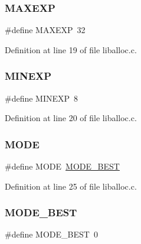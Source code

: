 \subsubsection{\texorpdfstring{M\+A\+X\+E\+XP}{MAXEXP}}
{\footnotesize\ttfamily \#define M\+A\+X\+E\+XP~32}



Definition at line 19 of file liballoc.\+c.

\mbox{\label{a00035_ae7249b0af4d1bfe02a4c7bdbf810bd8c_ae7249b0af4d1bfe02a4c7bdbf810bd8c}} 
\subsubsection{\texorpdfstring{M\+I\+N\+E\+XP}{MINEXP}}
{\footnotesize\ttfamily \#define M\+I\+N\+E\+XP~8}



Definition at line 20 of file liballoc.\+c.

\mbox{\label{a00035_ab8c52c1b4c021ed3e6b6b677bd2ac019_ab8c52c1b4c021ed3e6b6b677bd2ac019}} 
\subsubsection{\texorpdfstring{M\+O\+DE}{MODE}}
{\footnotesize\ttfamily \#define M\+O\+DE~\hyperlink{a00035_a881288ad0450ab9858bf01b030e755b0_a881288ad0450ab9858bf01b030e755b0}{M\+O\+D\+E\+\_\+\+B\+E\+ST}}



Definition at line 25 of file liballoc.\+c.

\mbox{\label{a00035_a881288ad0450ab9858bf01b030e755b0_a881288ad0450ab9858bf01b030e755b0}} 
\subsubsection{\texorpdfstring{M\+O\+D\+E\+\_\+\+B\+E\+ST}{MODE\_BEST}}
{\footnotesize\ttfamily \#define M\+O\+D\+E\+\_\+\+B\+E\+ST~0}




